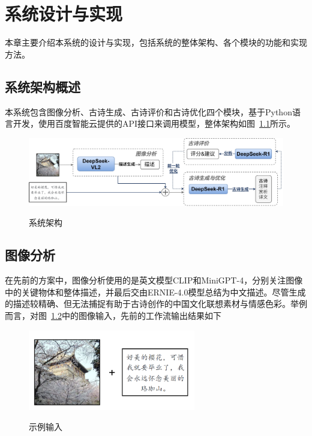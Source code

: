
\chapter{系统设计与实现}




本章主要介绍本系统的设计与实现，包括系统的整体架构、各个模块的功能和实现方法。

\section{系统架构概述}
本系统包含图像分析、古诗生成、古诗评价和古诗优化四个模块，基于Python语言开发，使用百度智能云提供的API接口来调用模型，整体架构如图~\ref{fig:system_architecture}所示。


\begin{figure}[h]
    \centering
    \includegraphics[width=1\textwidth]
    {figures/系统架构.jpg}\\
    \caption{系统架构}
    \label{fig:system_architecture}
\end{figure}

\section{图像分析} \label{sec:image_analysis}

在先前的方案中，图像分析使用的是英文模型CLIP和MiniGPT-4，分别关注图像中的关键物体和整体描述，并最后交由ERNIE-4.0模型总结为中文描述。尽管生成的描述较精确、但无法捕捉有助于古诗创作的中国文化联想素材与情感色彩。举例而言，对图~\ref{fig:example_input}中的图像输入，先前的工作流输出结果如下%

\begin{figure}[ht]
  \centering
  \includegraphics[width=0.65\textwidth]
  {figures/示例输入.png}\\
  \caption{示例输入}
  \label{fig:example_input} %
\end{figure}

